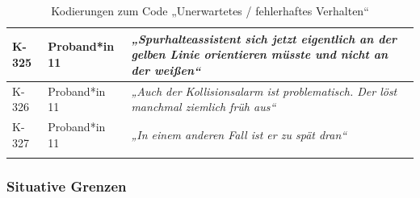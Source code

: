{\begin{xltabular}{\textwidth}{
    |P{0.10\textwidth}
    |P{0.17\textwidth}
    |Y|
}
\hline
K-325 & Proband*in 11 & \textit{„Spurhalteassistent sich jetzt eigentlich an der gelben Linie orientieren müsste und nicht an der weißen“} \\
\hline
K-326 & Proband*in 11 & \textit{„Auch der Kollisionsalarm ist problematisch. Der löst manchmal ziemlich früh aus“} \\
\hline
K-327 & Proband*in 11 & \textit{„In einem anderen Fall ist er zu spät dran“} \\
\hline
\caption{Kodierungen zum Code „Unerwartetes / fehlerhaftes Verhalten“}\label{tab:kodiernachweis-unerwartetes-fehlerhaftes-verhalten}\\
\end{xltabular}
}

\clearpage
\subsubsection{Situative Grenzen}

